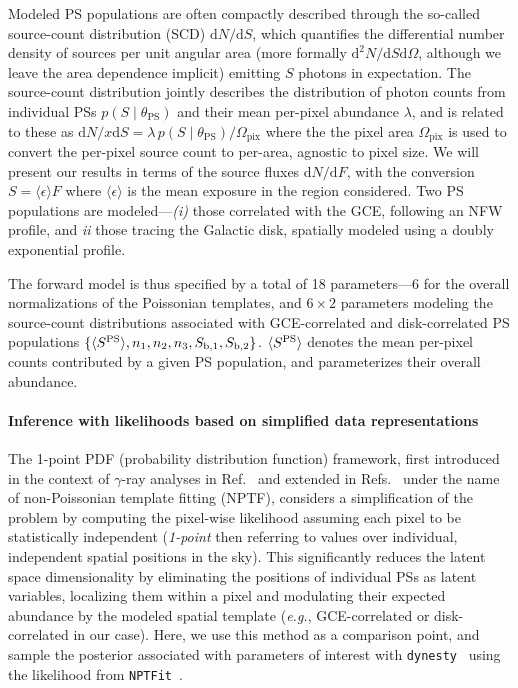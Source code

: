 \documentclass[]{article}
\newcommand{\dd}{\mathrm{d}}
\begin{document}
Modeled PS populations are often compactly described through the so-called source-count distribution (SCD) $\dd N /\dd S$, which quantifies the differential number density of sources per unit angular area (more formally $\dd^2 N /\dd S\dd\Omega$, although we leave the area dependence implicit) emitting $S$ photons in expectation. The source-count distribution jointly describes the distribution of photon counts from individual PSs $p(S\mid\theta_\mathrm{PS})$ and their mean per-pixel abundance $\lambda$, and is related to these as ${\dd N}/x{\dd S}=\lambda \, p(S\mid\theta_\mathrm{PS}) / \Omega_\mathrm{pix}$
where the the pixel area $\Omega_\mathrm{pix}$ is used to convert the per-pixel source count to per-area, agnostic to pixel size. We will present our results in terms of the source fluxes $\dd N /\dd F$, with the conversion $S = \langle \epsilon \rangle F$ where $\langle \epsilon \rangle$ is the mean exposure in the region considered. Two PS populations are modeled---\emph{(i)} those correlated with the GCE, following an NFW profile, and \emph{ii} those tracing the Galactic disk, spatially modeled using a doubly exponential profile.  %

The forward model is thus specified by a total of 18 parameters---6 for the overall normalizations of the Poissonian templates, and $6\times2$ parameters modeling the source-count distributions associated with GCE-correlated and disk-correlated PS populations $\{\langle S^{\rm PS} \rangle, n_1, n_2, n_3, S_{\mathrm b, 1}, S_{\mathrm b, 2}\}$. $\langle S^{\rm PS} \rangle$ denotes the mean per-pixel counts contributed by a given PS population, and parameterizes their overall abundance.

\paragraph{Inference with likelihoods based on simplified data representations} The 1-point PDF (probability distribution function) framework, first introduced in the context of $\gamma$-ray analyses in Ref.~\cite{Malyshev:2011zi} and extended in Refs.~\cite{Lee:2014mza,Lee:2015fea} under the name of non-Poissonian template fitting (NPTF), considers a simplification of the problem by computing the pixel-wise likelihood assuming each pixel to be statistically independent (\emph{1-point} then referring to values over individual, independent spatial positions in the sky). This significantly reduces the latent space dimensionality by eliminating the positions of individual PSs as latent variables, localizing them within a pixel and modulating their expected abundance by the modeled spatial template (\emph{e.g.}, GCE-correlated or disk-correlated in our case). Here, we use this method as a comparison point, and sample the posterior associated with parameters of interest with \texttt{dynesty}~\cite{Speagle_2020} using the likelihood from \texttt{NPTFit}~\cite{Mishra-Sharma:2016gis}.
\end{document}
